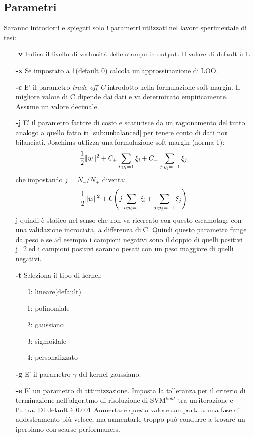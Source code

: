 \subsection{Parametri}
Saranno introdotti e spiegati solo i parametri utlizzati nel lavoro sperimentale di tesi:\\
\begin{itemize}
\item [\textbf{-v}] Indica il livello di verbosità delle stampe in output. Il valore di default è 1.
\item [\textbf{-x}] Se impostato a 1(default 0) calcola un'approssimazione di LOO.
\item [\textbf{-c}]  E' il parametro \textit{trade-off C} introdotto nella formulazione soft-margin. Il migliore valore di C dipende dai dati e va determinato empiricamente. Assume un valore decimale.
\item [\textbf{-j}] E' il parametro fattore di costo e scaturisce da un ragionamento del tutto analogo a quello fatto in \ref{sub:unbalanced} per tenere conto di dati non bilanciati. Joachims utilizza una formulazione  soft margin (norma-1):\begin{equation*}\frac{1}{2}\lVert w\rVert^2 + C_{+}\sum_{i:y_i=1}\xi_i + C_{-}\sum_{j:y_j=-1}\xi_j\end{equation*} che impostando $j=N_-/N_+$ diventa:
\begin{equation*}
\frac{1}{2}\lVert w\rVert^2 +C\Biggl(j\sum_{i:y_i=1}\xi_i + \sum_{j:y_j=-1}\xi_j\Biggl)
\end{equation*}
j quindi è statico nel senso che non va ricercato con questo escamotage con una validazione incrociata, a differenza di C. Quindi questo parametro funge da peso e se ad esempio i campioni negativi sono il doppio di quelli positivi j=2 ed i campioni positivi saranno pesati con un peso maggiore di quelli negativi.
\item [\textbf{-t}] Seleziona il tipo di kernel:
\begin{itemize}
\item[0:] lineare(default)
\item[1:] polinomiale
\item[2:] gaussiano
\item[3:] sigmoidale
\item[4:] personalizzato

\end{itemize}
\item[\textbf{-g}] E' il parametro $\gamma$ del kernel gaussiano.
\item[\textbf{-e}] E' un parametro di ottimizzazione. Imposta la tolleranza per il criterio di terminazione nell'algoritmo di risoluzione di SVM$^{light}$ tra un'iterazione e l'altra. Di default è 0.001 Aumentare questo valore comporta a una fase di addestramento più veloce, ma aumentarlo troppo può condurre a trovare un iperpiano con scarse performances.
\end{itemize}
 
